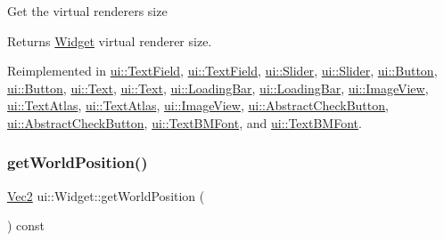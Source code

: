 Get the virtual renderer\textquotesingle{}s size \begin{DoxyReturn}{Returns}
\hyperlink{classui_1_1Widget}{Widget} virtual renderer size. 
\end{DoxyReturn}


Reimplemented in \hyperlink{classui_1_1TextField_a1eb2eb5212ee89b2f54dad80bd9a22ca}{ui\+::\+Text\+Field}, \hyperlink{classui_1_1TextField_a1ca24c7493ae07def476b7715f668390}{ui\+::\+Text\+Field}, \hyperlink{classui_1_1Slider_ab49069835dfbf66b2e5a2e6c99050bf6}{ui\+::\+Slider}, \hyperlink{classui_1_1Slider_a70a4f1507c4a95f317368512098959da}{ui\+::\+Slider}, \hyperlink{classui_1_1Button_a098e64c65b080b1333cdefc5cd24201d}{ui\+::\+Button}, \hyperlink{classui_1_1Button_aaae39c5dc7a9e11c1b68d4b0f3b7dcb0}{ui\+::\+Button}, \hyperlink{classui_1_1Text_a1a610c3ab53ff659e0f1b9071245bbc1}{ui\+::\+Text}, \hyperlink{classui_1_1Text_aabb0e1e54bad95f923c6b8206bf18b5a}{ui\+::\+Text}, \hyperlink{classui_1_1LoadingBar_a7f0a12ed6e25f65890b71d34dd3f3c91}{ui\+::\+Loading\+Bar}, \hyperlink{classui_1_1LoadingBar_a10855c54a44cd470286e3243c1cb58a0}{ui\+::\+Loading\+Bar}, \hyperlink{classui_1_1ImageView_ace03b24b332e54c73f4d36c83afddd3c}{ui\+::\+Image\+View}, \hyperlink{classui_1_1TextAtlas_a844dc4093d63a8ec2d4b6feac6247325}{ui\+::\+Text\+Atlas}, \hyperlink{classui_1_1TextAtlas_a3ec9a3a40ad49b44807ef9e42bc6dd2f}{ui\+::\+Text\+Atlas}, \hyperlink{classui_1_1ImageView_ae146b477fee678c08dfd0875aa0828df}{ui\+::\+Image\+View}, \hyperlink{classui_1_1AbstractCheckButton_a0c3cf028ae6915ee7eb59e287984b0ae}{ui\+::\+Abstract\+Check\+Button}, \hyperlink{classui_1_1AbstractCheckButton_a0ad1948a65d977a254aaf06ca584ad8b}{ui\+::\+Abstract\+Check\+Button}, \hyperlink{classui_1_1TextBMFont_a9ee876578d52a27bc967271ea3fa2b19}{ui\+::\+Text\+B\+M\+Font}, and \hyperlink{classui_1_1TextBMFont_a8fb5c5f091852376a0060487c1981943}{ui\+::\+Text\+B\+M\+Font}.

\mbox{\label{classui_1_1Widget_a312cec82d35501ebb0431ddf780dac07}} 
\subsubsection{\texorpdfstring{get\+World\+Position()}{getWorldPosition()}\hspace{0.1cm}{\footnotesize\ttfamily [1/2]}}
{\footnotesize\ttfamily \hyperlink{classVec2}{Vec2} ui\+::\+Widget\+::get\+World\+Position (\begin{DoxyParamCaption}{ }\end{DoxyParamCaption}) const}

